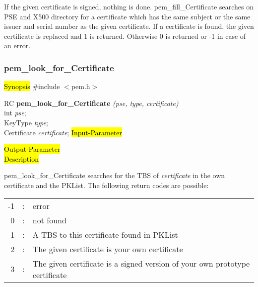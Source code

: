 If the given certificate is signed, nothing is done.
pem\_fill\_Certificate searches on PSE and X500 directory for a certificate
which has the same subject or the same issuer and serial number as the 
given certificate. If a certificate is found, the given certificate is replaced
and 1 is returned. Otherwise 0 is returned or -1 in case of an error.







 

\subsubsection{pem\_look\_for\_Certificate}
\label{pem_look_for_Certificate}
\hl{Synopsis}
\#include $<$pem.h$>$ 

RC {\bf pem\_look\_for\_Certificate} {\em (pse, type, certificate)} \\
int {\em pse}; \\
KeyType {\em type}; \\
Certificate {\em *certificate};
\hl{Input-Parameter}


\hl{Output-Parameter}
 \\
\hl{Description}

pem\_look\_for\_Certificate searches for the TBS of {\em certificate} in
the own certificate and the PKList. The following return codes are possible:

\begin{tabular}{rrl}
-1 &:& error \\
0 &:& not found \\
1 &:& A TBS to this certificate found in PKList \\
2 &:& The given certificate is your own certificate \\
3 &:& The given certificate is a signed version of your own prototype certificate \\
\end{tabular}








